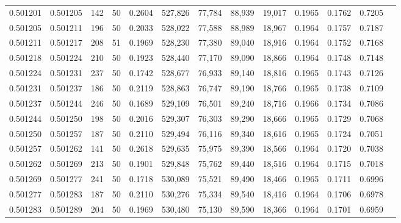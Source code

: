 \begin{tabular}{rrrrrrrrrrrrr}
0.501201 & 0.501205 & 142 &  50 &                                     0.2604 & 527,826 &  77,784 &  88,939 &  19,017 & 0.1965 & 0.1762 & 0.7205 \\
0.501205 & 0.501211 & 196 &  50 &                                     0.2033 & 528,022 &  77,588 &  88,989 &  18,967 & 0.1964 & 0.1757 & 0.7187 \\
0.501211 & 0.501217 & 208 &  51 &                                     0.1969 & 528,230 &  77,380 &  89,040 &  18,916 & 0.1964 & 0.1752 & 0.7168 \\
0.501218 & 0.501224 & 210 &  50 &                                     0.1923 & 528,440 &  77,170 &  89,090 &  18,866 & 0.1964 & 0.1748 & 0.7148 \\
0.501224 & 0.501231 & 237 &  50 &                                     0.1742 & 528,677 &  76,933 &  89,140 &  18,816 & 0.1965 & 0.1743 & 0.7126 \\
0.501231 & 0.501237 & 186 &  50 &                                     0.2119 & 528,863 &  76,747 &  89,190 &  18,766 & 0.1965 & 0.1738 & 0.7109 \\
0.501237 & 0.501244 & 246 &  50 &                                     0.1689 & 529,109 &  76,501 &  89,240 &  18,716 & 0.1966 & 0.1734 & 0.7086 \\
0.501244 & 0.501250 & 198 &  50 &                                     0.2016 & 529,307 &  76,303 &  89,290 &  18,666 & 0.1965 & 0.1729 & 0.7068 \\
0.501250 & 0.501257 & 187 &  50 &                                     0.2110 & 529,494 &  76,116 &  89,340 &  18,616 & 0.1965 & 0.1724 & 0.7051 \\
0.501257 & 0.501262 & 141 &  50 &                                     0.2618 & 529,635 &  75,975 &  89,390 &  18,566 & 0.1964 & 0.1720 & 0.7038 \\
0.501262 & 0.501269 & 213 &  50 &                                     0.1901 & 529,848 &  75,762 &  89,440 &  18,516 & 0.1964 & 0.1715 & 0.7018 \\
0.501269 & 0.501277 & 241 &  50 &                                     0.1718 & 530,089 &  75,521 &  89,490 &  18,466 & 0.1965 & 0.1711 & 0.6996 \\
0.501277 & 0.501283 & 187 &  50 &                                     0.2110 & 530,276 &  75,334 &  89,540 &  18,416 & 0.1964 & 0.1706 & 0.6978 \\
0.501283 & 0.501289 & 204 &  50 &                                     0.1969 & 530,480 &  75,130 &  89,590 &  18,366 & 0.1964 & 0.1701 & 0.6959 \\

\end{tabular}
